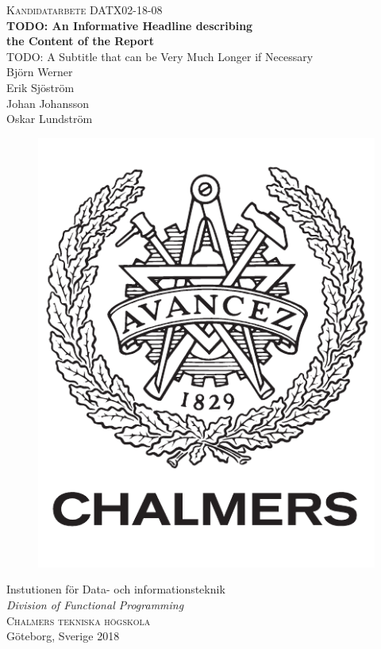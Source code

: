 \newpage
\thispagestyle{empty}
\begin{center}
	\textsc{\large Kandidatarbete DATX02-18-08}\\[4cm]		%
	\textbf{\Large TODO: An Informative Headline describing\\ the Content of the Report} \\[1cm]
	{\large TODO: A Subtitle that can be Very Much Longer if Necessary}\\[1cm]
  {\large Björn Werner}\\
	{\large Erik Sjöström}\\
	{\large Johan Johansson}\\
  {\large Oskar Lundström}\\

	\vfill
	\begin{figure}[H]
	\centering
	\includegraphics[width=0.2\pdfpagewidth]{figure/auxiliary/logo_swe.pdf} \\
	\end{figure}	\vspace{5mm}

	Instutionen för Data- och informationsteknik \\
	\emph{Division of Functional Programming}\\
	\textsc{Chalmers tekniska högskola} \\
	Göteborg, Sverige 2018 \\
\end{center}


